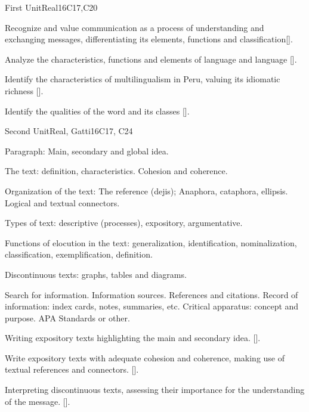 \begin{syllabus}
\begin{unit}{}{First Unit}{Real}{16}{C17,C20}
\begin{learningoutcomes}
   \item Recognize and value communication as a process of understanding and exchanging messages, differentiating its elements, functions and classification[\Usage].
   \item Analyze the characteristics, functions and elements of language and language [\Usage].
   \item Identify the characteristics of multilingualism in Peru, valuing its idiomatic richness [\Usage].
   \item Identify the qualities of the word and its classes [\Usage].
\end{learningoutcomes}
\end{unit}

\begin{unit}{}{Second Unit}{Real, Gatti}{16}{C17, C24}
\begin{topics}
   \item Paragraph: Main, secondary and global idea.
   \item The text: definition, characteristics. Cohesion and coherence.
   \item Organization of the text: The reference (dejis); Anaphora, cataphora, ellipsis. Logical and textual connectors.
   \item Types of text: descriptive (processes), expository, argumentative.
   \item Functions of elocution in the text: generalization, identification, nominalization, classification, exemplification, definition.
   \item Discontinuous texts: graphs, tables and diagrams.
   \item Search for information. Information sources. References and citations. Record of information: index cards, notes, summaries, etc. Critical apparatus: concept and purpose. APA Standards or other.
\end{topics}
\begin{learningoutcomes}
   \item Writing expository texts highlighting the main and secondary idea. [\Usage].
   \item Write expository texts with adequate cohesion and coherence, making use of textual references and connectors. [\Usage].
   \item Interpreting discontinuous texts, assessing their importance for the understanding of the message. [\Usage].
\end{learningoutcomes}
\end{unit}


\end{syllabus}
